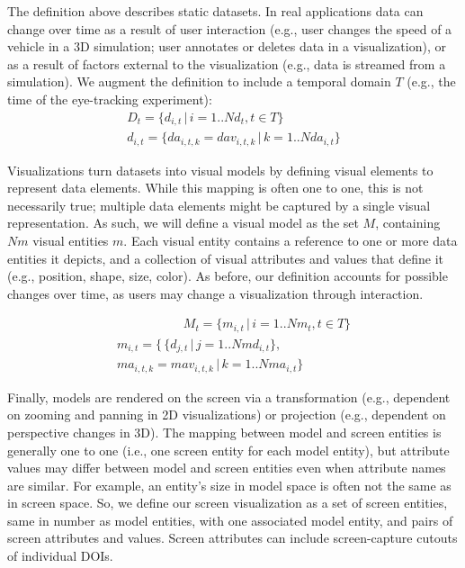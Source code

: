 The definition above describes static datasets. In real applications data can change over time as a result of user interaction (e.g., user changes the speed of a vehicle in a 3D simulation; user annotates or deletes data in a visualization), or as a result of factors external to the visualization (e.g., data is streamed from a simulation). We augment the definition to include a temporal domain $T$ (e.g., the time of the eye-tracking experiment):
\begin{equation*}
\begin{split}
D_t = \{d_{i,t} \,|\, i=1..N\!d_t, t \in T\} \\
d_{i,t} = \{da_{i,t,k} = dav_{i,t,k} \,|\, k=1..N\!da_{i,t}\}
\end{split}
\end{equation*}

Visualizations turn datasets into visual models by defining visual elements to represent data elements. While this mapping is often one to one, this is not necessarily true; multiple data elements might be captured by a single visual representation. As such, we will define a visual model as the set $M$, containing $N\!m$ visual entities $m$. Each visual entity contains a reference to one or more data entities it depicts, and a collection of visual attributes and values that define it (e.g., position, shape, size, color). As before, our definition accounts for possible changes over time, as users may change a visualization through interaction.  

\vspace{-4mm}
\begin{multline*}
\qquad\qquad\quad\; M_t = \{m_{i,t} \,|\, i=1..N\!m_t, t \in T\} \\
m_{i,t} = \{\,\{d_{j,t}\,|\, j=1..N\!md_{i,t}\}, \\ ma_{i,t,k} = mav_{i,t,k} \,|\, k=1..N\!ma_{i,t}\}
\end{multline*}

Finally, models are rendered on the screen via a transformation (e.g., dependent on zooming and panning in 2D visualizations) or projection (e.g., dependent on perspective changes in 3D). The mapping between model and screen entities is generally one to one (i.e., one screen entity for each model entity), but attribute values may differ between model and screen entities even when attribute names are similar. For example, an entity's size in  model space is often not the same as in screen space. So, we define our screen visualization as a set of screen entities, same in number as model entities, with one associated model entity, and pairs of screen attributes and values. Screen attributes can include screen-capture cutouts of individual DOIs.

